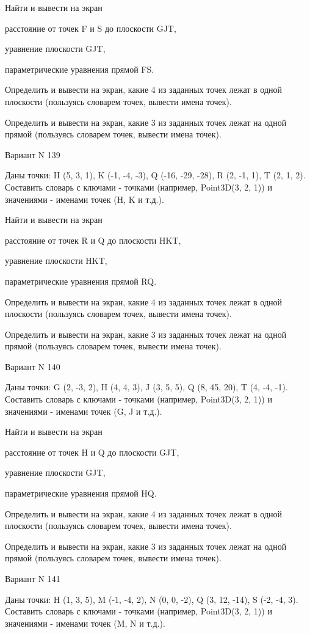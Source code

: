 \documentclass[11pt]{report}
\begin{document}
Найти и вывести на экран


расстояние от точек F и S до плоскости GJT,


уравнение плоскости GJT,


параметрические уравнения прямой FS.


Определить и вывести на экран, какие 4 из заданных точек лежат в одной плоскости (пользуясь словарем точек, вывести имена точек).


Определить и вывести на экран, какие 3 из заданных точек лежат на одной прямой (пользуясь словарем точек, вывести имена точек).

\newpage
Вариант N 139

Даны точки: H (5, 3, 1), K (-1, -4, -3), Q (-16, -29, -28), R (2, -1, 1), T (2, 1, 2).
Составить словарь с ключами - точками (например, Point3D(3, 2, 1)) и значениями - именами точек (H, K и т.д.).


Найти и вывести на экран


расстояние от точек R и Q до плоскости HKT,


уравнение плоскости HKT,


параметрические уравнения прямой RQ.


Определить и вывести на экран, какие 4 из заданных точек лежат в одной плоскости (пользуясь словарем точек, вывести имена точек).


Определить и вывести на экран, какие 3 из заданных точек лежат на одной прямой (пользуясь словарем точек, вывести имена точек).

\newpage
Вариант N 140

Даны точки: G (2, -3, 2), H (4, 4, 3), J (3, 5, 5), Q (8, 45, 20), T (4, -4, -1).
Составить словарь с ключами - точками (например, Point3D(3, 2, 1)) и значениями - именами точек (G, J и т.д.).


Найти и вывести на экран


расстояние от точек H и Q до плоскости GJT,


уравнение плоскости GJT,


параметрические уравнения прямой HQ.


Определить и вывести на экран, какие 4 из заданных точек лежат в одной плоскости (пользуясь словарем точек, вывести имена точек).


Определить и вывести на экран, какие 3 из заданных точек лежат на одной прямой (пользуясь словарем точек, вывести имена точек).

\newpage
Вариант N 141

Даны точки: H (1, 3, 5), M (-1, -4, 2), N (0, 0, -2), Q (3, 12, -14), S (-2, -4, 3).
Составить словарь с ключами - точками (например, Point3D(3, 2, 1)) и значениями - именами точек (M, N и т.д.).
\end{document}

